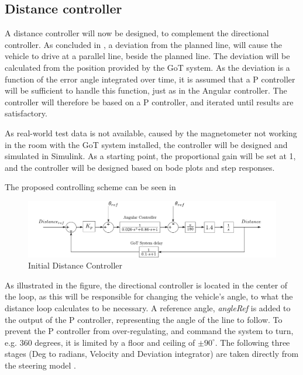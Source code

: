 \subsection{Distance controller}\label{ssec:distanceController}
A distance controller will now be designed, to complement the directional controller.
As concluded in , a deviation from the planned line, will cause the vehicle to drive at a parallel line, beside the planned line. The deviation will be calculated from the position provided by the GoT system. As the deviation is a function of the error angle integrated over time, it is assumed that a P controller will be sufficient to handle this function, just as in the Angular controller. The controller will therefore be based on a P controller, and iterated until results are satisfactory. 

As real-world test data is not available, caused by the magnetometer not working in the room with the GoT system installed, the controller will be designed and simulated in Simulink. As a starting point, the proportional gain will be set at 1, and the controller will be designed based on bode plots and step responses.

The proposed controlling scheme can be seen in 

\begin{figure}[H]
\centering
\includegraphics[width=1.1\textwidth]{figures/steeringFullModel.pdf} 
\caption{Initial Distance Controller}
\label{SteeringSimulink}
\end{figure}

As illustrated in the figure, the directional controller is located in the center of the loop, as this will be responsible for changing the vehicle's angle, to what the distance loop calculates to be necessary. A reference angle, \emph{angleRef} is added to the output of the P controller, representing the angle of the line to follow. To prevent the P controller from over-regulating, and command the system to turn, e.g. 360 degrees, it is limited by a floor and ceiling of $\pm 90^\circ$. The following three stages (Deg to radians, Velocity and Deviation integrator) are taken directly from the steering model .

